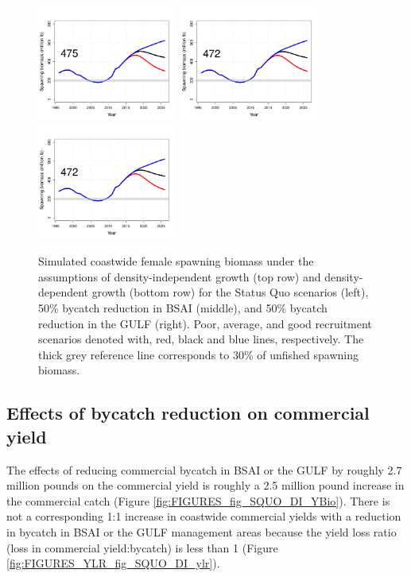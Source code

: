 \begin{figure}[htbp]
		\includegraphics[height=1.5in]{../FIGURES/fig_SQUO_DD_SBio.pdf}
		\includegraphics[height=1.5in]{../FIGURES/fig_BSAI_DD_SBio.pdf}
		\includegraphics[height=1.5in]{../FIGURES/fig_GULF_DD_SBio.pdf}
	\caption{Simulated coastwide female spawning biomass under the assumptions of density-independent growth (top row) and density-dependent growth (bottom row) for the Status Quo scenarios (left), 50\% bycatch reduction in BSAI (middle), and 50\% bycatch reduction in the GULF (right).  Poor, average, and good recruitment scenarios denoted with, red, black and blue lines, respectively.  The thick grey reference line corresponds to 30\% of unfished spawning biomass.}
	\label{fig:FIGURES_fig_SQUO_DI_SBio}
\end{figure}


\subsection{Effects of bycatch reduction on commercial yield} %
\label{sub:effects_of_bycatch_reduction_on_commercial_yield}
The effects of reducing commercial bycatch in BSAI or the GULF by roughly 2.7 million pounds on the commercial yield is roughly a 2.5 million pound increase in the commercial catch (Figure \ref{fig:FIGURES_fig_SQUO_DI_YBio}).  There is not a corresponding 1:1 increase in coastwide commercial yields with a reduction in bycatch in BSAI or the GULF management areas because the yield loss ratio (loss in commercial yield:bycatch) is less than 1 (Figure \ref{fig:FIGURES_YLR_fig_SQUO_DI_ylr}).


